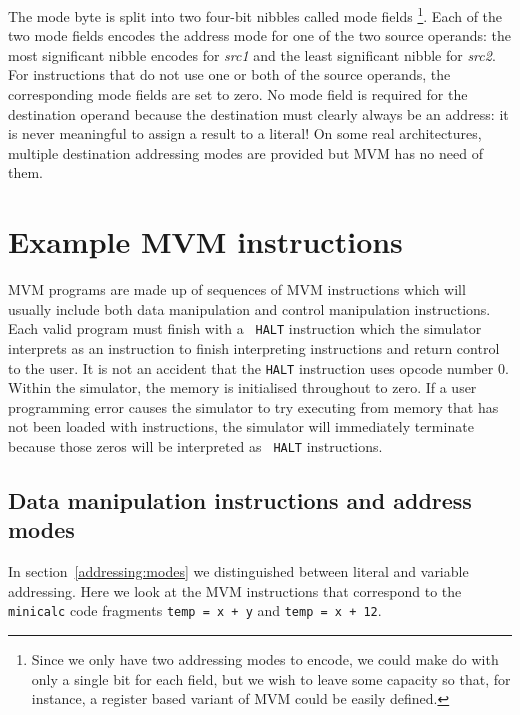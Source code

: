 The mode byte is split into two four-bit nibbles called mode fields
\footnote{Since we only have two addressing modes to encode, we could make do with
only a single bit for each field, but we wish to leave some capacity so
that, for instance, a register based variant of MVM could be easily
defined.}. Each of the two mode fields encodes the address mode for one of
the two source operands: the most significant nibble encodes for {\em
src1} and the least significant nibble for {\em src2}. For instructions
that do not use one or both of the source operands, the corresponding
mode fields are set to zero. No mode field is required for the
destination operand because the destination must clearly always be an
address: it is never meaningful to assign a result to a literal! On some
real architectures, multiple destination addressing modes are provided
but MVM has no need of them.

\section{Example MVM instructions}

MVM programs are made up of sequences of MVM instructions which will
usually include both data manipulation and control manipulation
instructions. Each valid program must finish with a {\tt
HALT} instruction which the simulator interprets as an  instruction to
finish interpreting instructions and return control to the user. It is
not an accident that the {\tt HALT} instruction uses opcode number 0.
Within the simulator, the memory is initialised throughout to zero. If a
user programming error causes the simulator to try executing from memory
that has not been loaded with instructions, the simulator will
immediately terminate because those zeros will be interpreted as {\tt
HALT} instructions.

\subsection{Data manipulation instructions and address modes}

In section~\ref{addressing:modes} we distinguished between literal
and variable addressing. Here we look at the MVM instructions that
correspond to the {\tt minicalc} code fragments {\tt temp = x + y} and
{\tt temp = x + 12}.


